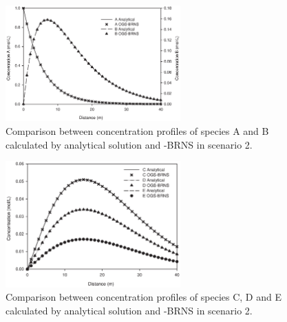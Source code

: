 \begin{figure}[htbp]
\centering
\includegraphics[width=0.6\textwidth]{PART_III/HC/Chain_Reaction_Figure3_sun1999verification2_AB.eps}
\caption{Comparison between concentration profiles of species A and B calculated by analytical solution and \GeoSys-BRNS in scenario 2. }
\label{chain_reactions_fig3}
\end{figure}

\begin{figure}[htbp]
\centering
\includegraphics[width=0.6\textwidth]{PART_III/HC/Chain_Reaction_Figure4_sun1999verification2_CDE.eps}
\caption{Comparison between concentration profiles of species C, D and E calculated by analytical solution and \GeoSys-BRNS in scenario 2. }
\label{chain_reactions_fig4}
\end{figure}

